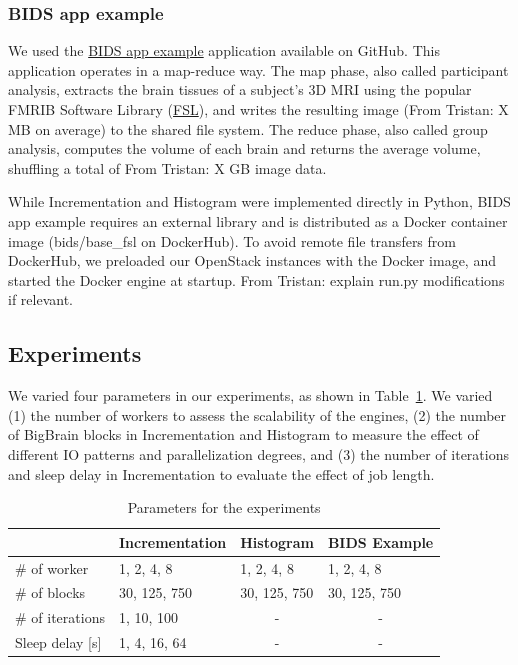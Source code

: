 \documentclass[conference]{IEEEtran}
\newcommand{\TG}[1]{\color{cyan}From Tristan: #1 \color{black}}
\begin{document}
\subsubsection{BIDS app example}

We used the \href{https://github.com/BIDS-Apps/example}{BIDS app example}
application available on GitHub. This application operates in a map-reduce
way. The map phase, also called participant analysis, extracts the brain
tissues of a subject's 3D MRI using the popular FMRIB Software Library
(\href{https://fsl.fmrib.ox.ac.uk/fsl/fslwiki}{FSL}), and writes the
resulting image (\TG{X}MB on average) to the shared file system. The reduce
phase, also called group analysis, computes the volume of each brain and
returns the average volume, shuffling a total of \TG{X}GB image data.

While Incrementation and Histogram were implemented directly in Python,
BIDS app example requires an external library and is distributed as a
Docker container image (bids/base\_fsl on DockerHub). To avoid remote file
transfers from DockerHub, we preloaded our OpenStack instances with the
Docker image, and started the Docker engine at startup. \TG{explain run.py modifications if relevant.}

\subsection{Experiments}

We varied four parameters in our experiments, as shown in
Table~\ref{tab:param}. We varied (1) the number of workers to assess the
scalability of the engines, (2) the number of BigBrain blocks in
Incrementation and Histogram to measure the effect of different IO patterns
and parallelization degrees, and (3) the number of iterations and sleep
delay in Incrementation to evaluate the effect of job length.


\begin{table}[!t]
    \renewcommand{\arraystretch}{1.3}
    \caption{Parameters for the experiments}\label{tab:param}
    \centering
    \begin{tabular*}{\columnwidth}{llll}
    \hline
                        & Incrementation & Histogram             & BIDS Example          \\ \hline
    \# of worker        & 1, 2, 4, 8     & 1, 2, 4, 8            & 1, 2, 4, 8            \\
    \# of blocks        & 30, 125, 750   & 30, 125, 750          & 30, 125, 750          \\
    \# of iterations    & 1, 10, 100     & \multicolumn{1}{c}{-} & \multicolumn{1}{c}{-} \\
    Sleep delay {[}s{]} & 1, 4, 16, 64   & \multicolumn{1}{c}{-} & \multicolumn{1}{c}{-} \\ \hline
    \end{tabular*}
    \end{table}
\end{document}
